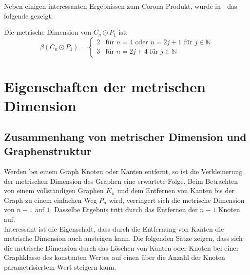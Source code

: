 Neben einigen interessanten Ergebnissen zum Corona Produkt, wurde in  \grqq$\;$\cite{bases} das folgende gezeigt:
\begin{lem}Die metrische Dimension von $C_n \odot P_1$ ist:
\begin{equation}
  \beta(C_n \odot P_1)=
   \begin{cases}
     2 & \text{f\"ur } n = 4 \text{ oder } n = 2j+1 \text{ f\"ur } j \in \mathbb{N} \\
     3 & \text{f\"ur } n = 2j+4 \text{ f\"ur } j \in \mathbb{N} 
   \end{cases}
\end{equation}
\end{lem}
\chapter{Eigenschaften der metrischen Dimension}
\label{kapallg}
\section{Zusammenhang von metrischer Dimension und Graphenstruktur}
Werden bei einem Graph Knoten oder Kanten entfernt, so ist die Verkleinerung der metrischen Dimension des Graphen eine erwartete Folge. Beim Betrachten von einem vollständigen Graphen $K_n$ und dem Entfernen von Kanten bis der Graph zu einem einfachen Weg $P_n$ wird, verringert sich die metrische Dimension von $n-1$ auf $1$. Dasselbe Ergebnis tritt durch das Entfernen der $n-1$ Knoten auf.\\Interessant ist die Eigenschaft, dass durch die Entfernung von Kanten die metrische Dimension auch ansteigen kann. Die folgenden Sätze zeigen, dass sich die metrische Dimension durch das Löschen von Kanten oder Knoten bei einer Graphklasse des konstanten Wertes auf einen über die Anzahl der Knoten parametrisiertem Wert steigern kann.
